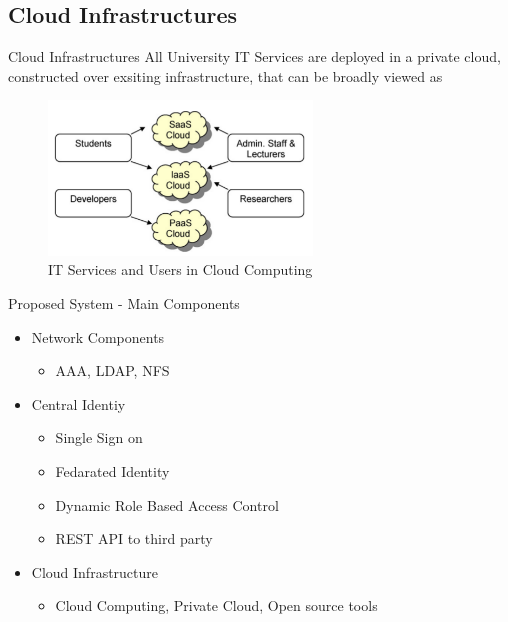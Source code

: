 \documentclass[10pt,xcolor=dvipsnames]{beamer}
\begin{document}
\subsection{Cloud Infrastructures}
\begin{frame}{Cloud Infrastructures}
All University IT Services are deployed in a private cloud, constructed over exsiting infrastructure, that can be broadly viewed as 
	
\begin{figure}[H]
\begin{center}
\includegraphics[width=7cm]{./it2.png}
\caption{ IT Services and Users in Cloud Computing\label{fig:IT Services and Users in Cloud Computing }}
\end{center}
\end{figure}	
	
	
\end{frame}

\begin{frame}{Proposed System -  Main Components}
\begin{itemize}
	
	\item Network Components 
	\begin{itemize}
		\item AAA, LDAP, NFS
	\end{itemize}
	\item Central Identiy 
	\begin{itemize}
		\item Single Sign on
		\item Fedarated Identity
		\item Dynamic Role Based Access Control
		\item REST API to third party
	\end{itemize}
	\item Cloud Infrastructure
	\begin{itemize}
		\item Cloud Computing, Private Cloud, Open source tools
	\end{itemize}
\end{itemize}
\end{frame}
\end{document}
